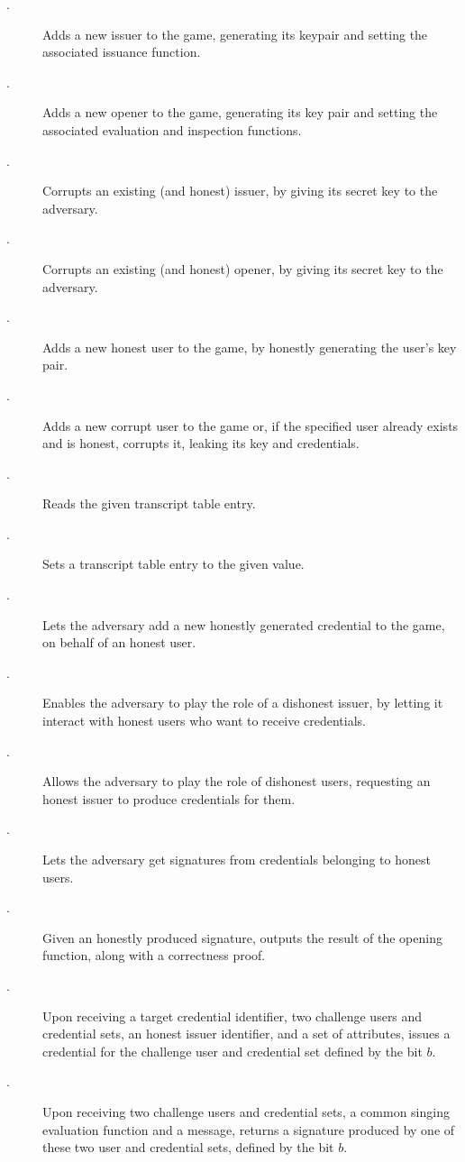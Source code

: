 \begin{description}
\item[\IGEN.] Adds a new issuer to the game, generating its keypair and setting
  the associated issuance function.
\item[\OGEN.] Adds a new opener to the game, generating its key pair and
  setting the associated evaluation and inspection functions.
\item[\ICORR.] Corrupts an existing (and honest) issuer, by giving its secret
  key to the adversary.
\item[\OCORR.] Corrupts an existing (and honest) opener, by giving its secret
  key to the adversary.  
\item[\HUGEN.] Adds a new honest user to the game, by honestly generating
  the user's key pair.
\item[\CUGEN.] Adds a new corrupt user to the game or, if the specified
  user already exists and is honest, corrupts it, leaking its key and
  credentials.
\item[\RREG.] Reads the given transcript table entry.
\item[\WREG.] Sets a transcript table entry to the given value.
\item[\OBTISS.] Lets the adversary add a new honestly generated credential to
  the game, on behalf of an honest user.
\item[\OBTAIN.] Enables the adversary to play the role of a dishonest issuer, by
  letting it interact with honest users who want to receive credentials.
\item[\ISSUE.] Allows the adversary to play the role of dishonest users,
  requesting an honest issuer to produce credentials for them.
\item[\SIGN.] Lets the adversary get signatures from credentials belonging
  to honest users.
\item[\OPEN.] Given an honestly produced signature, outputs the result of the
  opening function, along with a correctness proof.
\item[\OBTCHALb.] Upon receiving a target credential identifier, two challenge
  users and credential sets, an honest issuer identifier, and a set of
  attributes, issues a credential for the challenge user and credential set
  defined by the bit $b$. 
\item[\CHALb.] Upon receiving two challenge users and credential sets, a common
  singing evaluation function and a message, returns a signature produced by one
  of these two user and credential sets, defined by the bit $b$.
\end{description}

